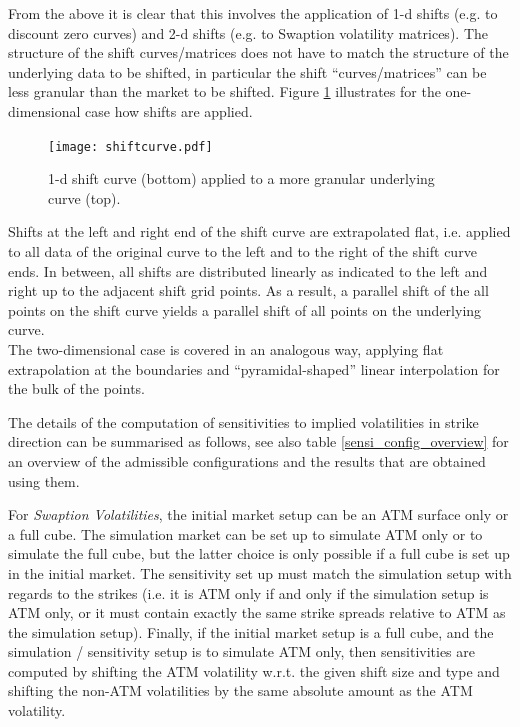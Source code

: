 \documentclass[12pt, a4paper]{article}
\begin{document}
{\begin{appendix}
From the above it is clear that this involves the application of 1-d shifts (e.g. to discount zero curves) and 2-d shifts (e.g. to Swaption volatility matrices). The structure of the shift curves/matrices does not have to match the structure of the underlying data to be shifted, in particular the shift ``curves/matrices'' can be less granular than the market to be shifted. 
Figure \ref{fig_shiftcurve} illustrates for the one-dimensional case how shifts are applied.
\begin{figure}[h]
\begin{center}
\texttt{[image: shiftcurve.pdf]}
\end{center}
\caption{1-d shift curve (bottom) applied to a more granular underlying curve (top). }
\label{fig_shiftcurve}
\end{figure} 

Shifts at the left and right end of the shift curve are extrapolated flat, i.e. applied to all data of the original curve to the left and to the right of the shift curve ends. In between, all shifts are distributed linearly as indicated to the left and right up to the adjacent shift grid points. As a result, a parallel shift of the all points on the shift curve yields a parallel shift of all points on the underlying curve.   \\

The two-dimensional case is covered in an analogous way, applying flat extrapolation at the boundaries and ``pyramidal-shaped'' linear interpolation for the bulk of the points. 

The details of the computation of sensitivities to implied volatilities in strike direction can be summarised as
follows, see also table \ref{sensi_config_overview} for an overview of the admissible configurations and the results
that are obtained using them.

\medskip
For {\em Swaption Volatilities}, the initial market setup can be an ATM surface only or a full cube. The simulation
market can be set up to simulate ATM only or to simulate the full cube, but the latter choice is only possible if a full cube is set
up in the initial market. The sensitivity set up must match the simulation setup with regards to the strikes (i.e. it
is ATM only if and only if the simulation setup is ATM only, or it must contain exactly the same strike spreads relative
to ATM as the simulation setup). Finally, if the initial market setup is a full cube, and the simulation / sensitivity
setup is to simulate ATM only, then sensitivities are computed by shifting the ATM volatility w.r.t. the given shift size and type and
shifting the non-ATM volatilities by the same absolute amount as the ATM volatility.


\end{appendix}}
\end{document}
